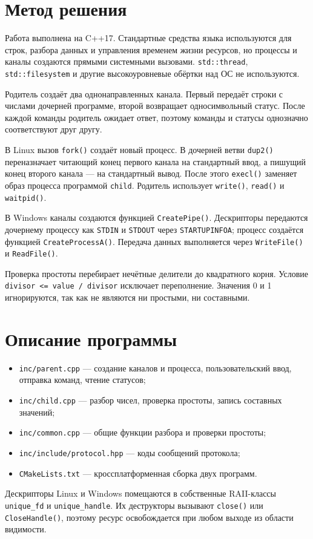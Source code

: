 \section{Метод решения}

Работа выполнена на C++17. Стандартные средства языка используются для строк,
разбора данных и управления временем жизни ресурсов, но процессы и каналы
создаются прямыми системными вызовами. \texttt{std::thread},
\texttt{std::filesystem} и другие высокоуровневые обёртки над ОС не
используются.

Родитель создаёт два однонаправленных канала. Первый передаёт строки с числами
дочерней программе, второй возвращает односимвольный статус. После каждой
команды родитель ожидает ответ, поэтому команды и статусы однозначно
соответствуют друг другу.

В Linux вызов \texttt{fork()} создаёт новый процесс. В дочерней ветви
\texttt{dup2()} переназначает читающий конец первого канала на стандартный
ввод, а пишущий конец второго канала --- на стандартный вывод. После этого
\texttt{execl()} заменяет образ процесса программой \texttt{child}. Родитель
использует \texttt{write()}, \texttt{read()} и \texttt{waitpid()}.

В Windows каналы создаются функцией \texttt{CreatePipe()}. Дескрипторы
передаются дочернему процессу как \texttt{STDIN} и \texttt{STDOUT} через
\texttt{STARTUPINFOA}; процесс создаётся функцией \texttt{CreateProcessA()}.
Передача данных выполняется через \texttt{WriteFile()} и \texttt{ReadFile()}.

Проверка простоты перебирает нечётные делители до квадратного корня. Условие
\texttt{divisor <= value / divisor} исключает переполнение. Значения 0 и 1
игнорируются, так как не являются ни простыми, ни составными.

\section{Описание программы}

\begin{itemize}
    \item \texttt{inc/parent.cpp} --- создание каналов и процесса,
    пользовательский ввод, отправка команд, чтение статусов;
    \item \texttt{inc/child.cpp} --- разбор чисел, проверка простоты,
    запись составных значений;
    \item \texttt{inc/common.cpp} --- общие функции разбора и проверки
    простоты;
    \item \texttt{inc/include/protocol.hpp} --- коды сообщений протокола;
    \item \texttt{CMakeLists.txt} --- кроссплатформенная сборка двух
    программ.
\end{itemize}

Дескрипторы Linux и Windows помещаются в собственные RAII-классы
\texttt{unique\_fd} и \texttt{unique\_handle}. Их деструкторы вызывают
\texttt{close()} или \texttt{CloseHandle()}, поэтому ресурс освобождается
при любом выходе из области видимости.